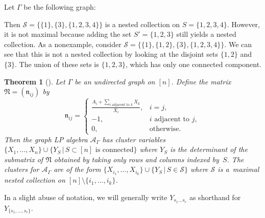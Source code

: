 \documentclass[10pt,a4paper]{amsart}
\numberwithin{equation}{section}
\newtheorem{Theorem}{Theorem}[section]
\newcommand{\new}[1]{{#1}}
\newcommand{\calS}{\mathcal{S}}
\begin{document}
\begin{Example}\label{ex:nested-coll}
Let $\Gamma$ be the following graph:
\begin{center}
\end{center}
Then $\calS=\{\{1\},\{3\},\{1,2,3,4\}\}$ is a nested collection on $S=\{1,2,3,4\}$. However, it is not maximal because adding the set $S'=\{1,2,3\}$ still yields a nested collection.
As a nonexample, consider $\calS=\{\{1\},\{1,2\},\{3\},\{1,2,3,4\}\}$. We can see that this is not a nested collection by looking at the disjoint sets $\{1,2\}$ and $\{3\}$. The union of these sets is $\{1,2,3\}$, which has only one connected component.
\end{Example}
\begin{Theorem}[{\cite[Theorem 1.1]{LP-16}}]\label{thm:graph-LP-defn}
Let $\Gamma$ be an undirected graph on $[n]$. Define the matrix $\mathfrak{N}=(\mathfrak{n}_{ij})$ by \[\mathfrak{n}_{ij}=\begin{cases}
{\displaystyle \new{\frac{ A_i+\sum_{i\text{ adjacent to }k}X_k}{X_i}}}, & i=j, \\
-1, & i\text{ adjacent to }j, \\
0, & \text{otherwise}.
\end{cases}\]
Then the graph LP algebra $\mathcal{A}_\Gamma$ has cluster variables $\{X_1,\dots,X_n\} \cup \{Y_S\, |\, S\subset[n]\text{ is connected}\}$ where $Y_S$ is the determinant of the submatrix of $\mathfrak{N}$ obtained by taking only rows and columns indexed by~$S$. The clusters for $\new{\mathcal{A}_\Gamma}$ are of the form $\{X_{i_1},\dots,X_{i_k}\}\cup\{Y_S\, |\, S\in \calS\}$ where $\calS$ is a~maximal nested collection on $[n]\setminus\{i_1,\dots,i_k\}$.
\end{Theorem}
In a slight abuse of notation, we will generally write $Y_{s_1\dots s_r}$ as shorthand for $Y_{\{s_1,\dots,s_r\}}$.
\end{document}
